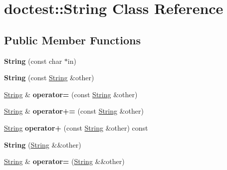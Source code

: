 \hypertarget{classdoctest_1_1_string}{}\section{doctest\+::String Class Reference}
\label{classdoctest_1_1_string}
\subsection*{Public Member Functions}
\begin{DoxyCompactItemize}
\item 
\mbox{\label{classdoctest_1_1_string_abb4449cbc613cd973ae774c704fca5dd}} 
{\bfseries String} (const char $\ast$in)
\item 
\mbox{\label{classdoctest_1_1_string_a27ca7976da20bdebbf225fa496c38ad1}} 
{\bfseries String} (const \mbox{\hyperlink{classdoctest_1_1_string}{String}} \&other)
\item 
\mbox{\label{classdoctest_1_1_string_a1979700c536cfe9b5fecc328245f74ca}} 
\mbox{\hyperlink{classdoctest_1_1_string}{String}} \& {\bfseries operator=} (const \mbox{\hyperlink{classdoctest_1_1_string}{String}} \&other)
\item 
\mbox{\label{classdoctest_1_1_string_ad1df797f12cd140e3d1739f2b30b64d2}} 
\mbox{\hyperlink{classdoctest_1_1_string}{String}} \& {\bfseries operator+=} (const \mbox{\hyperlink{classdoctest_1_1_string}{String}} \&other)
\item 
\mbox{\label{classdoctest_1_1_string_a6ddb6cf1b744a0ae1d4e26b3c8dfa827}} 
\mbox{\hyperlink{classdoctest_1_1_string}{String}} {\bfseries operator+} (const \mbox{\hyperlink{classdoctest_1_1_string}{String}} \&other) const
\item 
\mbox{\label{classdoctest_1_1_string_a4bbdcb36cd68988953c3bb2d18e53210}} 
{\bfseries String} (\mbox{\hyperlink{classdoctest_1_1_string}{String}} \&\&other)
\item 
\mbox{\label{classdoctest_1_1_string_a6099dbedeb150eb5659c7aa5dcea1727}} 
\mbox{\hyperlink{classdoctest_1_1_string}{String}} \& {\bfseries operator=} (\mbox{\hyperlink{classdoctest_1_1_string}{String}} \&\&other)

\end{DoxyCompactItemize}
